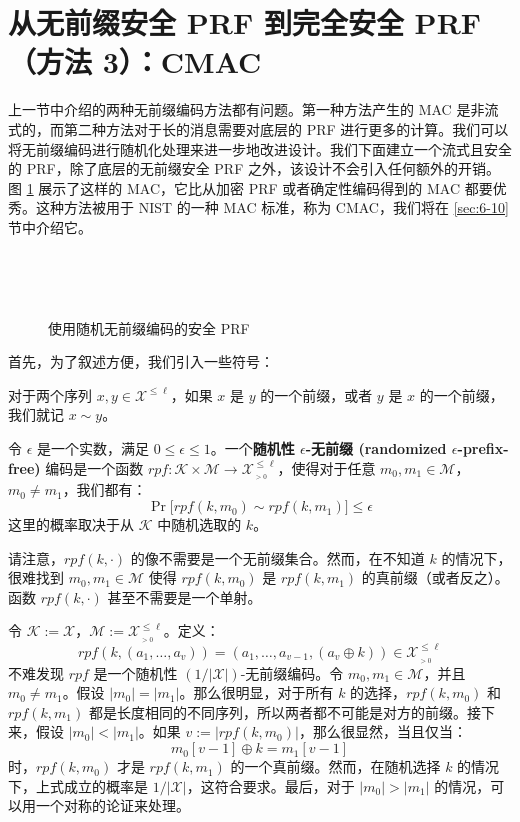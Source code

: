 \section{从无前缀安全 PRF 到完全安全 PRF（方法 3）：CMAC}\label{sec:6-7}

上一节中介绍的两种无前缀编码方法都有问题。第一种方法产生的 MAC 是非流式的，而第二种方法对于长的消息需要对底层的 PRF 进行更多的计算。我们可以将无前缀编码进行随机化处理来进一步地改进设计。我们下面建立一个流式且安全的 PRF，除了底层的无前缀安全 PRF 之外，该设计不会引入任何额外的开销。图 \ref{fig:6-6} 展示了这样的 MAC，它比从加密 PRF 或者确定性编码得到的 MAC 都要优秀。这种方法被用于 NIST 的一种 MAC 标准，称为 CMAC，我们将在 \ref{sec:6-10} 节中介绍它。

\begin{figure}
  \centering
  
  \,
  
  \,
  
  \caption{使用随机无前缀编码的安全 PRF}
  \label{fig:6-6}
\end{figure}

首先，为了叙述方便，我们引入一些符号：

\begin{definition}\label{def:6-5}
对于两个序列 $x,y\in\mathcal{X}^{\leq\ell}$，如果 $x$ 是 $y$ 的一个前缀，或者 $y$ 是 $x$ 的一个前缀，我们就记 $x\sim y$。
\end{definition}

\begin{definition}\label{def:6-6}
令 $\epsilon$ 是一个实数，满足 $0\leq\epsilon\leq1$。一个\textbf{随机性 $\epsilon$-无前缀 (randomized $\epsilon$-prefix-free)} 编码是一个函数 $rpf:\mathcal{K}\times\mathcal{M}\to\mathcal{X}^{\leq\ell}_{_{>0}}$，使得对于任意 $m_0,m_1\in\mathcal{M}$，$m_0\neq m_1$，我们都有：
\[
\Pr\big[rpf(k,m_0)\sim rpf(k,m_1)\big]\leq\epsilon
\]
这里的概率取决于从 $\mathcal{K}$ 中随机选取的 $k$。
\end{definition}

\noindent
请注意，$rpf(k,\cdot)$ 的像不需要是一个无前缀集合。然而，在不知道 $k$ 的情况下，很难找到 $m_0,m_1\in\mathcal{M}$ 使得 $rpf(k,m_0)$ 是 $rpf(k,m_1)$ 的真前缀（或者反之）。函数 $rpf(k,\cdot)$ 甚至不需要是一个单射。

\begin{snote}
令 $\mathcal{K}:=\mathcal{X}$，$\mathcal{M}:=\mathcal{X}^{\leq\ell}_{_{>0}}$。定义：
\[
rpf(k,(a_1,\dots,a_v))=(a_1,\dots,a_{v-1},(a_v\oplus k))\in\mathcal{X}^{\leq\ell}_{_{>0}}
\]
不难发现 $rpf$ 是一个随机性 $({1}/{|\mathcal{X}|})$-无前缀编码。令 $m_0,m_1\in\mathcal{M}$，并且 $m_0\neq m_1$。假设 $|m_0|=|m_1|$。那么很明显，对于所有 $k$ 的选择，$rpf(k,m_0)$ 和 $rpf(k,m_1)$ 都是长度相同的不同序列，所以两者都不可能是对方的前缀。接下来，假设 $|m_0|<|m_1|$。如果 $v:=|rpf(k,m_0)|$，那么很显然，当且仅当：
\[
m_0[v-1]\oplus k=m_1[v-1]
\]
时，$rpf(k,m_0)$ 才是 $rpf(k,m_1)$ 的一个真前缀。然而，在随机选择 $k$ 的情况下，上式成立的概率是 ${1}/{|\mathcal{X}|}$，这符合要求。最后，对于 $|m_0|>|m_1|$ 的情况，可以用一个对称的论证来处理。
\end{snote}

